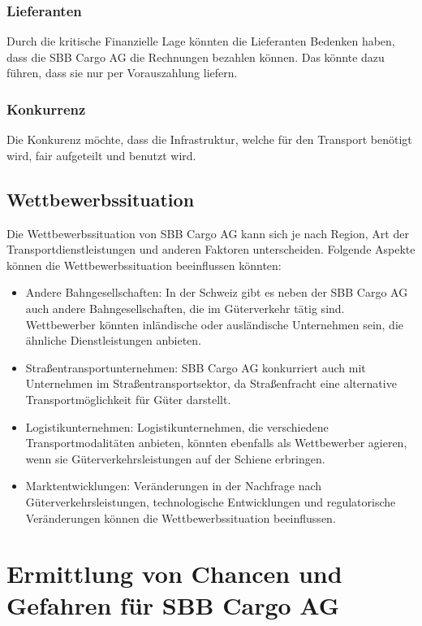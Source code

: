 \documentclass{article}
\begin{document}
\subsubsection{Lieferanten}
Durch die kritische Finanzielle Lage könnten die Lieferanten Bedenken haben, dass die SBB Cargo AG die Rechnungen bezahlen können.
Das könnte dazu führen, dass sie nur per Vorauszahlung liefern.

\subsubsection{Konkurrenz}
Die Konkurenz möchte, dass die Infrastruktur, welche für den Transport benötigt wird, fair aufgeteilt und benutzt wird.


\subsection{Wettbewerbssituation}
Die Wettbewerbssituation von SBB Cargo AG kann sich je nach Region, Art der Transportdienstleistungen und anderen Faktoren unterscheiden.
Folgende Aspekte können die Wettbewerbssituation beeinflussen könnten: 

\begin{itemize}
    \item Andere Bahngesellschaften:
    In der Schweiz gibt es neben der SBB Cargo AG auch andere Bahngesellschaften, die im Güterverkehr tätig sind.
    Wettbewerber könnten inländische oder ausländische Unternehmen sein, die ähnliche Dienstleistungen anbieten. 
    \item Straßentransportunternehmen:
    SBB Cargo AG konkurriert auch mit Unternehmen im Straßentransportsektor, da Straßenfracht eine alternative Transportmöglichkeit für Güter darstellt. 
    \item Logistikunternehmen:
    Logistikunternehmen, die verschiedene Transportmodalitäten anbieten, könnten ebenfalls als Wettbewerber agieren, wenn sie Güterverkehrsleistungen auf der Schiene erbringen.
    \item Marktentwicklungen:
    Veränderungen in der Nachfrage nach Güterverkehrsleistungen, technologische Entwicklungen und regulatorische Veränderungen können die Wettbewerbssituation beeinflussen. 
\end{itemize}

\section{Ermittlung von Chancen und Gefahren für SBB Cargo AG}
\end{document}
